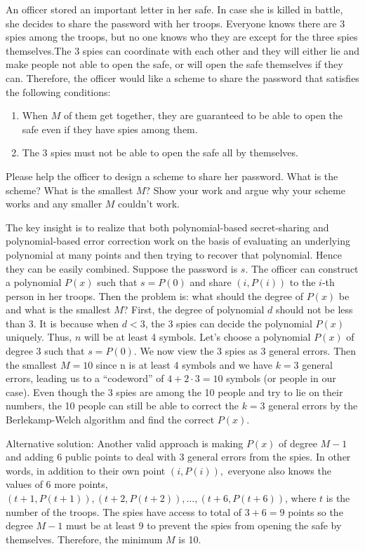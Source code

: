\question An officer stored an important letter in her safe. In case 
she is killed in battle, she decides to share the password with her 
troops. Everyone knows there are 3 spies among the troops, but no one 
knows who they are except for the three spies themselves.The 3 spies 
can coordinate with each other and they will either lie and make people 
not able to open the safe, or will open the safe themselves if they can. 
Therefore, the officer would like a scheme to share the password that 
satisfies the following conditions: 
 \begin{enumerate}
\item When $M$ of them get together, they are guaranteed to be able to 
open the safe even if they have spies among them. 
\item The 3 spies must not be able to open the safe all by themselves. 
 \end{enumerate}
 
Please help the officer to design a scheme to share her password. What 
is the scheme? What is the smallest $M$? Show your work and argue why 
your scheme works and any smaller $M$ couldn’t work.

\begin{solution}
The key insight is to realize that both polynomial-based secret-sharing 
and polynomial-based error correction work on the basis of evaluating 
an underlying polynomial at many points and then trying to recover that 
polynomial. Hence they can be easily combined. Suppose the password is 
$s$. The officer can construct a polynomial $P(x)$ such that $s = P(0)$ and 
share $(i,P(i))$ to the $i$-th person in her troops. Then the problem is: 
what should the degree of $P(x)$ be and what is the smallest $M$? 
First, the degree of polynomial $d$ should not be less than 3. It is 
because when $d < 3$, the 3 spies can decide the polynomial $P(x)$ uniquely. 
Thus, $n$ will be at least 4 symbols. Let’s choose a polynomial $P(x)$ of 
degree 3 such that $s = P(0)$. We now view the 3 spies as 3 general errors. 
Then the smallest $M = 10$ since n is at least 4 symbols and we have $k = 3 $
general errors, leading us to a “codeword” of $4+2 \cdot 3 = 10$ symbols 
(or people in our case). Even though the 3 spies are among the 10 people 
and try to lie on their numbers, the 10 people can still be able to 
correct the $k = 3$ general errors by the Berlekamp-Welch algorithm and 
find the correct $P(x)$. 

Alternative solution: Another valid approach is making $P(x)$ of degree 
$M − 1$ and adding 6 public points to deal with 3 general errors from 
the spies. In other words, in addition to their own point $(i,P(i)), $
 everyone also knows the values of 6 more points, 
$(t +1,P(t +1)),(t +2,P(t +2)), \dotsc ,(t +6,P(t +6))$, where $t$ is the number 
of the troops. The spies have access to total of $3+6 = 9$ points so the 
degree $M - 1 $ must be at least 9 to prevent the spies from opening the 
safe by themselves. Therefore, the minimum $M$ is 10.
\end{solution}
\newpage